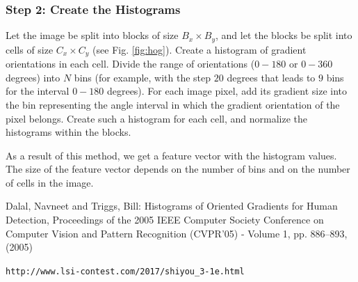 \documentclass[12pt]{article}
\begin{document}
\subsubsection*{Step 2: Create the Histograms}

Let the image be split into blocks of size $B_x \times B_y$, and let the blocks be split into cells of size $C_x \times C_y$ (see Fig. \ref{fig:hog}).
Create a histogram of gradient orientations in each cell.
Divide the range of orientations ($0-180$ or $0-360$ degrees) into $N$ bins (for example, with the step $20$ degrees that leads to $9$ bins for the interval $0-180$ degrees).
For each image pixel, add its gradient size into the bin representing the angle interval in which the gradient orientation of the pixel belongs.
Create such a histogram for each cell, and normalize the histograms within the blocks.

As a result of this method, we get a feature vector with the histogram values.
The size of the feature vector depends on the number of bins and on the number of cells in the image.
\newline
\newline

\begin{thebibliography}{2}
Dalal, Navneet and Triggs, Bill: Histograms of Oriented Gradients for Human Detection, Proceedings of the 2005 IEEE Computer Society Conference on Computer Vision and Pattern Recognition (CVPR'05) - Volume 1, pp. 886--893,(2005)

\texttt{http://www.lsi-contest.com/2017/shiyou\_3-1e.html}
\end{thebibliography}
\end{document}
